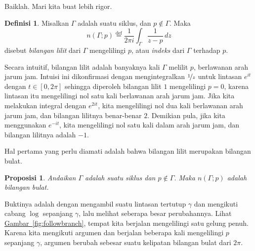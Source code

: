 \documentclass[12pt,openany]{book}
\newcommand{\myindex}[1]{#1\index{#1}}
\theoremstyle{plain}
\newtheorem{prop}[thm]{Proposisi}
\theoremstyle{remark}
\theoremstyle{definition}
\newtheorem{defn}[thm]{Definisi}
\theoremstyle{exercise}
\theoremstyle{example}
\newcommand{\figureref}[1]{\hyperref[#1]{Gambar~\ref*{#1}}}
\begin{document}
Baiklah.  Mari kita buat lebih rigor.

\begin{defn}\label{defn:windingnumber}
Misalkan $\Gamma$ adalah
suatu siklus,
dan $p \notin \Gamma$.  Maka
%
\begin{equation*}
n(\Gamma;p)
\overset{\text{def}}{=}
\frac{1}{2\pi i} \int_\Gamma \frac{1}{z-p} \, dz
\end{equation*}
disebut
\emph{\myindex{bilangan lilit}} dari $\Gamma$ mengelilingi $p$, atau
\emph{\myindex{indeks}} dari $\Gamma$ terhadap $p$.
\end{defn}

Secara intuitif, bilangan lilit adalah banyaknya kali $\Gamma$ melilit
$p$, berlawanan arah jarum jam.  Intuisi ini dikonfirmasi dengan mengintegralkan
$\nicefrac{1}{z}$ untuk lintasan $e^{it}$ dengan $t \in [0,2\pi]$ sehingga diperoleh
bilangan lilit $1$ mengelilingi $p=0$,
karena lintasan itu mengelilingi nol satu kali berlawanan arah jarum jam.  Jika kita melakukan
integral dengan $e^{2it}$, kita mengelilingi nol dua kali 
berlawanan arah jarum jam, dan bilangan lilitnya benar-benar $2$.  Demikian pula,
jika kita menggunakan $e^{-it}$, kita mengelilingi nol satu kali dalam
arah jarum jam, dan bilangan lilitnya adalah $-1$.

Hal pertama yang perlu diamati adalah bahwa bilangan lilit merupakan bilangan bulat.

\begin{prop} \label{prop:indexinteger}
Andaikan $\Gamma$ adalah suatu siklus dan $p \notin \Gamma$.  Maka
$n(\Gamma;p)$ adalah bilangan bulat.
\end{prop}

Buktinya adalah dengan mengambil suatu lintasan tertutup $\gamma$
dan mengikuti cabang $\log$ sepanjang $\gamma$, lalu
melihat seberapa besar perubahannya.  Lihat \figureref{fig:followbranch}, tempat kita
berjalan mengelilingi satu gelung penuh.  Karena kita mengikuti argumen
dan berjalan beberapa kali mengelilingi $p$ sepanjang $\gamma$,
argumen berubah sebesar suatu kelipatan bilangan bulat dari $2\pi$.
\end{document}
